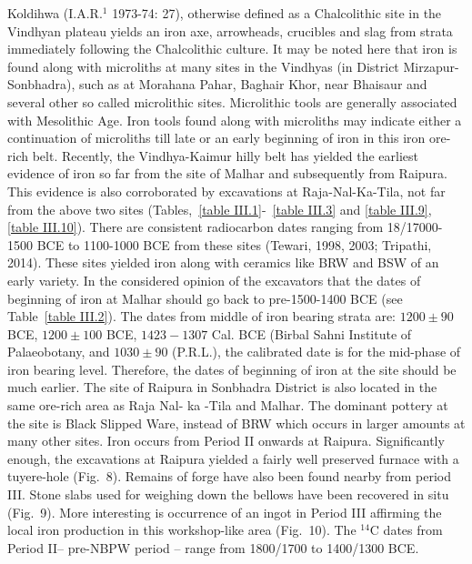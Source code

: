 Koldihwa (I.A.R.$^{1}$ 1973-74: 27), otherwise defined as a Chalcolithic site in the Vindhyan plateau yields an iron axe, arrowheads, crucibles and slag from strata immediately following the Chalcolithic culture. It may be noted here that iron is found along with microliths at many sites in the Vindhyas (in District Mirzapur-Sonbhadra), such as at Morahana Pahar, Baghair Khor, near Bhaisaur and several other so called microlithic sites. Microlithic tools are generally associated with Mesolithic Age. Iron tools found along with microliths may indicate either a continuation of microliths till late or an early beginning of iron in this iron ore-rich belt. Recently, the Vindhya-Kaimur hilly belt has yielded the earliest evidence of iron so far from the site of Malhar and subsequently from Raipura. This evidence is also corroborated by excavations at Raja-Nal-Ka-Tila, not far from the above two sites (Tables,~\ref{table III.1}-~\ref{table III.3} and \ref{table III.9}, \ref{table III.10}). There are consistent radiocarbon dates ranging from 18/17000-1500 BCE to 1100-1000 BCE from these sites (Tewari, 1998, 2003; Tripathi, 2014). These sites yielded iron along with ceramics like BRW and BSW of an early variety. In the considered opinion of the excavators that the dates of beginning of iron at Malhar should go back to pre-1500-1400 BCE (see Table~\ref{table III.2}). The dates from middle of iron bearing strata are: $1200\pm 90$ BCE, $1200\pm100$ BCE, $1423-1307$ Cal. BCE (Birbal Sahni Institute of Palaeobotany, and $1030\pm 90$ (P.R.L.), the calibrated date is for the mid-phase of iron bearing level. Therefore, the dates of beginning of iron at the site should be much earlier. The site of Raipura in Sonbhadra District is also located in the same ore-rich area as Raja Nal- ka -Tila and Malhar. The dominant pottery at the site is Black Slipped Ware, instead of BRW which occurs in larger amounts at many other sites. Iron occurs from Period II onwards at Raipura. Significantly enough, the excavations at Raipura yielded a fairly well preserved furnace with a tuyere-hole (Fig.~8). Remains of forge have also been found nearby from period III. Stone slabs used for weighing down the bellows have been recovered in situ (Fig.~9). More interesting is occurrence of an ingot in Period III affirming the local iron production in this workshop-like area (Fig.~10). The ${}^{14}$C dates from Period II– pre-NBPW period – range from 1800/1700 to 1400/1300 BCE.

